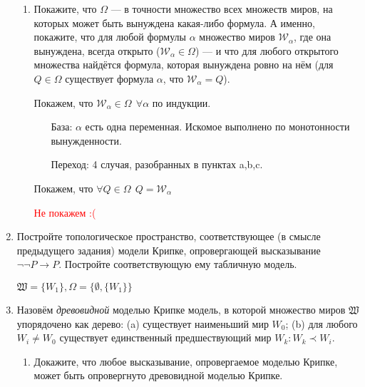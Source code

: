 \begin{enumerate}[wide, labelwidth=!, labelindent=0pt]
\begin{enumerate}

                  \item Покажите, что $\Omega$ --- в точности множество всех множеств миров, на которых может быть вынуждена какая-либо формула.
                        А именно, покажите, что для любой формулы $\alpha$ множество миров $\mathcal{W}_\alpha$, где она вынуждена, всегда открыто
                        ($\mathcal{W}_\alpha \in \Omega$) --- и что для любого открытого множества найдётся формула, которая вынуждена ровно на нём
                        (для $Q \in \Omega$ существует формула $\alpha$, что $\mathcal{W}_\alpha = Q$).

                        Покажем, что \(\mathcal{W}_\alpha \in \Omega \ \ \forall \alpha\) по индукции.

                        \begin{itemize}
                              \item [База:] \(\alpha\) есть одна переменная. Искомое выполнено по монотонности вынужденности.
                              \item [Переход:] 4 случая, разобранных в пунктах a,b,c.
                        \end{itemize}

                        Покажем, что \(\forall Q\in \Omega \ \ Q = \mathcal{W}_\alpha\)

                        \textcolor{red}{Не покажем :(}
            \end{enumerate}

      \item Постройте топологическое пространство, соответствующее (в смысле предыдущего задания) модели Крипке, опровергающей
            высказывание $\neg\neg P\rightarrow P$.
            Постройте соответствующую ему табличную модель.

            \(\mathfrak{W} = \{W_1\}, \Omega = \{\emptyset, \{W_1\}\} \)

      \item Назовём \emph{древовидной} моделью Крипке модель, в которой множество
            миров $\mathfrak{W}$ упорядочено как дерево: (a) существует наименьший мир
            $W_0$; (b) для любого $W_i \ne W_0$ существует единственный предшествующий мир
            $W_k: W_k \prec W_i$.
            \begin{enumerate}
                  \item Докажите, что любое высказывание, опровергаемое моделью Крипке, может
                        быть опровергнуто древовидной моделью Крипке.


\end{enumerate}
\end{enumerate}

